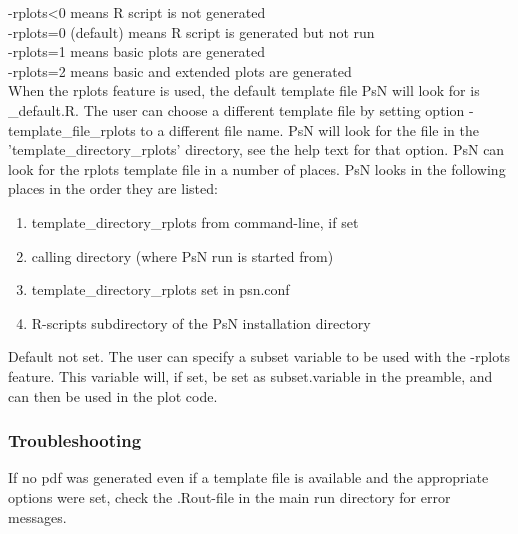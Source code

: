 \begin{optionlist}
-rplots<0 means R script is not generated\\ 
-rplots=0 (default) means R script is generated but not run\\ 
-rplots=1 means basic plots are generated\\													  
-rplots=2 means basic and extended plots are generated\\													  
\nextopt
{}
When the rplots feature is used, the default template file PsN will look for is 
\guidetoolname\_default.R. 
The user can choose a different template file
by setting option -template\_file\_rplots to a different file name. 
PsN will look for the file in the 'template\_directory\_rplots' directory, see the help text 
for that option.
\nextopt
{}
PsN can look for the rplots template file in a number of places. 
PsN looks in the following places in the order they are listed:
\begin{enumerate}
\item template\_directory\_rplots from command-line, if set 
\item calling directory (where PsN run is started from)
\item template\_directory\_rplots set in psn.conf 
\item R-scripts subdirectory of the PsN installation directory
\end{enumerate}
\nextopt
{}
Default not set. The user can specify a subset variable to be used with the -rplots feature. 
This variable
will, if set, be set as subset.variable in the preamble,
and can then be used in the plot code.  
\nextopt
\end{optionlist}

\subsubsection*{Troubleshooting}
If no pdf was generated even if a template file is available and the appropriate options
were set, check the .Rout-file in the main run directory for error messages.
